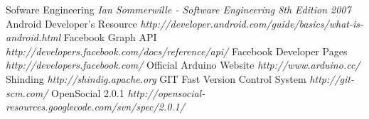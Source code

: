 \begin{thebibliography}{99}
 Sofware Engineering {\em Ian Sommerwille - Software Engineering 8th Edition 2007}
 Android Developer's Resource  {\em http://developer.android.com/guide/basics/what-is-android.html}
 Facebook Graph API {\em http://developers.facebook.com/docs/reference/api/}
 Facebook Developer Pages {\em http://developers.facebook.com/}
 Official Arduino Website {\em http://www.arduino.cc/}
 Shinding {\em http://shindig.apache.org}
 GIT Fast Version Control System {\em http://git-scm.com/}
 OpenSocial 2.0.1 {\em http://opensocial-resources.googlecode.com/svn/spec/2.0.1/}
\end{thebibliography}